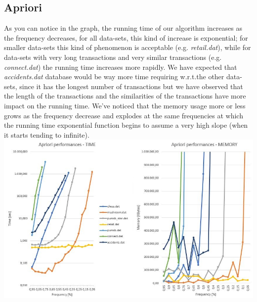 \documentclass[11pt, a4paper]{article}
\begin{document}
		\subsection{Apriori}
			\noindent
			As you can notice in the graph, the running time of our algorithm increases as the frequency decreases, for all data-sets, this kind of increase is exponential; for smaller data-sets this kind of phenomenon is acceptable (e.g. \textit{retail.dat}), while for data-sets with very long transactions and very similar transactions (e.g. \textit{connect.dat}) the running time increases more rapidly. \newline
			We have expected that \textit{accidents.dat} database would be way more time requiring w.r.t.the other data-sets, since it has the longest number of transactions but we have observed that the length of the transactions and the similarities of the transactions have more impact on the running time.
			We've noticed that the memory usage more or less grows as the frequency decrease and explodes at the same frequencies at which the running time exponential function begins to assume a very high slope (when it starts tending to infinite).\newline
			\includegraphics[scale =0.6]{Apriori.JPG}
\end{document}
